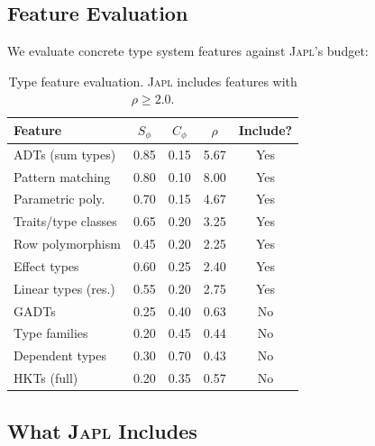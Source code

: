 \documentclass[11pt,twocolumn]{article}
\newcommand{\japl}{\textsc{Japl}}
\begin{document}
\subsection{Feature Evaluation}

We evaluate concrete type system features against \japl{}'s budget:

\begin{table}[H]
\centering
\scriptsize
\begin{tabularx}{\columnwidth}{lcccc}
\toprule
\textbf{Feature} & $S_\phi$ & $C_\phi$ & $\rho$ & \textbf{Include?} \\
\midrule
ADTs (sum types) & 0.85 & 0.15 & 5.67 & Yes \\
Pattern matching & 0.80 & 0.10 & 8.00 & Yes \\
Parametric poly. & 0.70 & 0.15 & 4.67 & Yes \\
Traits/type classes & 0.65 & 0.20 & 3.25 & Yes \\
Row polymorphism & 0.45 & 0.20 & 2.25 & Yes \\
Effect types & 0.60 & 0.25 & 2.40 & Yes \\
Linear types (res.) & 0.55 & 0.20 & 2.75 & Yes \\
\midrule
GADTs & 0.25 & 0.40 & 0.63 & No \\
Type families & 0.20 & 0.45 & 0.44 & No \\
Dependent types & 0.30 & 0.70 & 0.43 & No \\
HKTs (full) & 0.20 & 0.35 & 0.57 & No \\
\bottomrule
\end{tabularx}
\caption{Type feature evaluation. \japl{} includes features with $\rho \geq 2.0$.}
\label{tab:type-budget}
\end{table}

\subsection{What \japl{} Includes}
\end{document}
